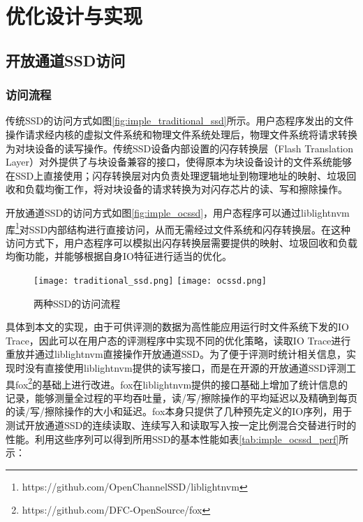 \chapter{优化设计与实现}
\label{cha:imple}

\section{开放通道SSD访问}
\subsection{访问流程}
传统SSD的访问方式如图\ref{fig:imple_traditional_ssd}所示。用户态程序发出的文件操作请求经内核的虚拟文件系统和物理文件系统处理后，物理文件系统将请求转换为对块设备的读写操作。传统SSD设备内部设置的闪存转换层（Flash Translation Layer）对外提供了与块设备兼容的接口，使得原本为块设备设计的文件系统能够在SSD上直接使用；闪存转换层对内负责处理逻辑地址到物理地址的映射、垃圾回收和负载均衡工作，将对块设备的请求转换为对闪存芯片的读、写和擦除操作。

开放通道SSD的访问方式如图\ref{fig:imple_ocssd}，用户态程序可以通过liblightnvm库\footnote{https://github.com/OpenChannelSSD/liblightnvm}对SSD内部结构进行直接访问，从而无需经过文件系统和闪存转换层。在这种访问方式下，用户态程序可以模拟出闪存转换层需要提供的映射、垃圾回收和负载均衡功能，并能够根据自身IO特征进行适当的优化。

\begin{figure}[H]
    \centering
      {\texttt{[image: traditional\_ssd.png]}}
    \hspace{4em}
        {\texttt{[image: ocssd.png]}}
    \caption{两种SSD的访问流程}
    \label{fig:imple_ssdvisit}
\end{figure}

具体到本文的实现，由于可供评测的数据为高性能应用运行时文件系统下发的IO Trace，因此可以在用户态的评测程序中实现不同的优化策略，读取IO Trace进行重放并通过liblightnvm直接操作开放通道SSD。为了便于评测时统计相关信息，实现时没有直接使用liblightnvm提供的读写接口，而是在开源的开放通道SSD评测工具fox\footnote{https://github.com/DFC-OpenSource/fox}的基础上进行改进。fox在liblightnvm提供的接口基础上增加了统计信息的记录，能够测量全过程的平均吞吐量，读/写/擦除操作的平均延迟以及精确到每页的读/写/擦除操作的大小和延迟。fox本身只提供了几种预先定义的IO序列，用于测试开放通道SSD的连续读取、连续写入和读取写入按一定比例混合交替进行时的性能。利用这些序列可以得到所用SSD的基本性能如表\ref{tab:imple_ocssd_perf}所示：

